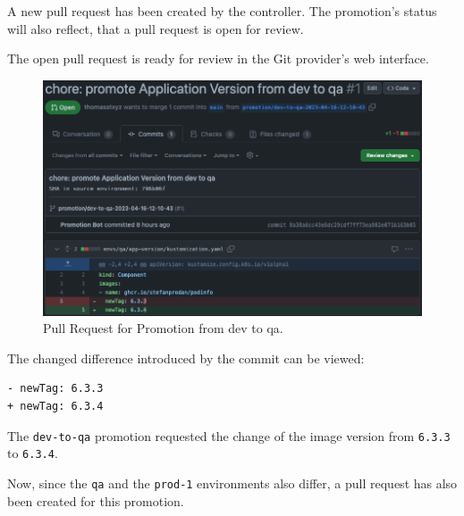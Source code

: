 A new pull request
has been created by the controller.
The promotion's status will also reflect, that
a pull request is open for review.



The open pull request is ready for review in the Git provider's web interface.
\begin{figure}[h]
	\centering
	\includegraphics[width=1.00\linewidth]{assets/prom-pr-dev-to-qa.png}
	\caption{Pull Request for Promotion from dev to qa.
	}
	\label{fig:prom-pr-dev-to-qa}	
\end{figure}

The changed difference introduced by the commit can be viewed:

\begin{lstlisting}
- newTag: 6.3.3
+ newTag: 6.3.4
\end{lstlisting}

The \lstinline|dev-to-qa| promotion requested the change of the image version from
\lstinline|6.3.3| to \lstinline|6.3.4|.

Now, since the \lstinline|qa| and the \lstinline|prod-1| environments
also differ,
a pull request has also been created for this promotion.

